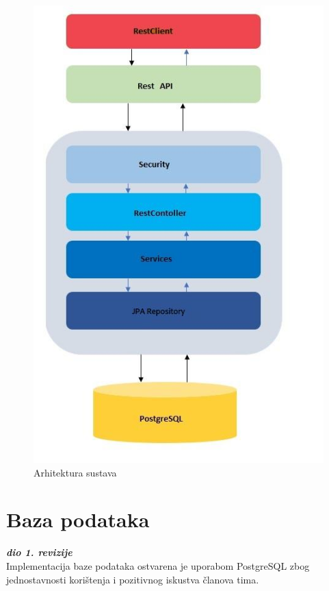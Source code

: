 			\begin{figure}[H]
			\includegraphics[scale=0.9]{slike/arhitektura3.jpg} %
			\centering
			\caption {Arhitektura sustava}
			\label{fig:promjene}
		\end{figure}

		\newpage	
		\section{Baza podataka}
			
			\textbf{\textit{dio 1. revizije}}\\
		
		Implementacija baze podataka ostvarena je uporabom PostgreSQL zbog jednostavnosti korištenja i pozitivnog iskustva članova tima. 
		
